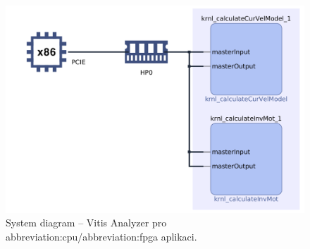 \documentclass[a4paper, twoside, 11pt]{article}
\begin{document}
		

	\begin{figure}[htbp!]
		\centering
		\includegraphics[width=1\textwidth]{src/png/vitis-analyzer/rt/keyboard-input-10-values-loop/writing-data-output/rt-system-diagram-crop.png}
		\caption{System diagram – Vitis Analyzer pro \gls{abbreviation:cpu}/\gls{abbreviation:fpga} aplikaci.}
		\label{fig:rt-system-diagram-crop}
	\end{figure}
\end{document}
